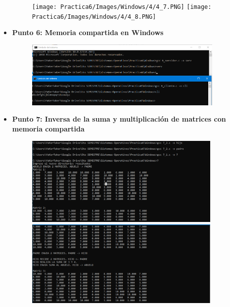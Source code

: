 \documentclass[12pt]{article}
\begin{document}
\begin{itemize}
\begin{figure}[h!]
                   \texttt{[image: Practica6/Images/Windows/4/4\_7.PNG]}
                    \texttt{[image: Practica6/Images/Windows/4/4\_8.PNG]}
                \end{figure}
                

          \item[\Checkmark] \textbf{Punto 6: Memoria compartida en Windows} 
            \begin{figure}[h!]
                    \centering
                   \includegraphics[width=0.91\textwidth]{Practica6/Images/Windows/6.PNG}
            \end{figure}
            \clearpage
            
            \item[\Checkmark] \textbf{Punto 7: Inversa de la suma y multiplicación de matrices con memoria compartida} 
            \begin{figure}[h!]
                    \centering
                     \includegraphics[width=0.9\textwidth]{Practica6/Images/Windows/7_1.PNG}
                   \includegraphics[width=0.9\textwidth]{Practica6/Images/Windows/7_2.PNG}
                   

\end{figure}
\end{itemize}
\end{document}
